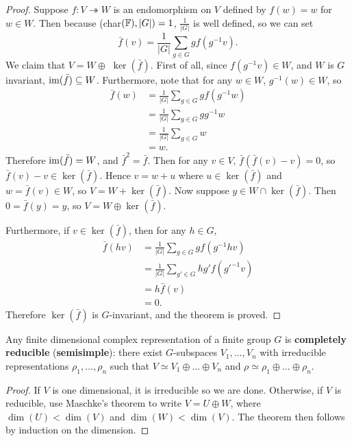 \documentclass[a4paper]{article}
\begin{document}
\begin{proof} Suppose $f: V \twoheadrightarrow W$ is an endomorphism on $V$ defined by $f(w) = w$ for $w \in W$. Then because (char$(\mathbb{F}), |G|) = 1$, $\frac{1}{|G|}$ is well defined, so we can set  
$$\bar{f}(v) = \frac{1}{|G|}\sum_{g\in G} gf(g^{-1}v).$$
We claim that $V = W \oplus$ $\ker(\bar{f})$. First of all, since $f(g^{-1}v) \in W$, and $W$ is $G$ invariant, $\operatorname{im}(\bar{f}) \subseteq W$. Furthermore, note that for any $w \in W$, $g^{-1}(w) \in W$, so 
\begin{align*}
\bar{f}(w) &= \frac{1}{|G|}\sum_{g\in G} g f(g^{-1}w)\\ 
&= \frac{1}{|G|}\sum_{g\in G} g g^{-1}w\\ 
&= \frac{1}{|G|}\sum_{g\in G} w\\ 
&= w.
\end{align*}
Therefore $\operatorname{im}(\bar{f}) = W$, and $\bar{f}^2 = \bar{f}$. Then for any $v \in V$, $\bar{f}(\bar{f}(v) - v) = 0$, so $\bar{f}(v) - v \in \ker(\bar{f})$. Hence $v = w + u$ where $u \in \ker(\bar{f})$ and $w = \bar{f}(v) \in W$, so $V = W + \ker(\bar{f})$. Now suppose $y \in W \cap \ker(\bar{f})$. Then $0 = \bar{f}(y) = y$, so $V = W \oplus \ker(\bar{f})$.

Furthermore, if $v \in \ker(\bar{f})$, then for any $h \in G$, 
\begin{align*}
\bar{f}(hv)  &= \frac{1}{|G|}\sum_{g\in G} g f(g^{-1}hv)\\ 
    &= \frac{1}{|G|}\sum_{g'\in G} hg'f(g'^{-1}v)\\ 
    &= h\bar{f}(v)\\ 
    &= 0.
\end{align*}
Therefore $\ker(\bar{f})$ is $G$-invariant, and the theorem is proved. 
\end{proof} 

\begin{cor}
    Any finite dimensional complex representation of a finite group $G$ is \textbf{completely reducible} (\textbf{semisimple}): there exist $G$-subspaces $V_1, \hdots, V_n$ with irreducible representations $\rho_1, \hdots, \rho_n$ such that $V \simeq V_1 \oplus \hdots \oplus V_n$ and $\rho \simeq \rho_1 \oplus \hdots \oplus \rho_n$.
\end{cor}

\begin{proof} If $V$ is one dimensional, it is irreducible so we are done. Otherwise, if $V$ is reducible, use Maschke's theorem to write $V = U \oplus W$, where $\dim(U) < \dim(V)$ and  $\dim(W) < \dim(V)$. The theorem then follows by induction on the dimension.
\end{proof}
\end{document}
